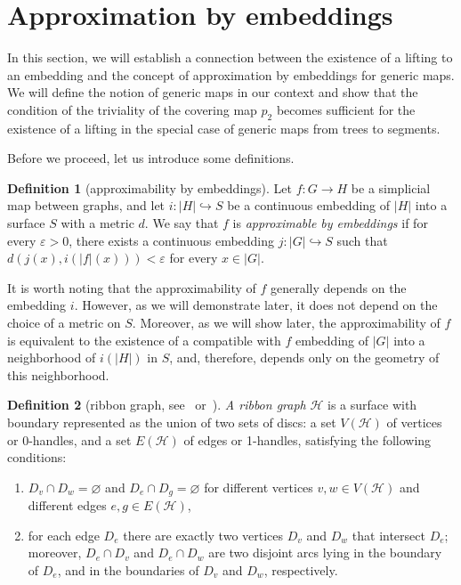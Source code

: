 \documentclass[a4paper,12pt,reqno,oneside]{amsart}
\theoremstyle{plain}
\theoremstyle{definition}
\newtheorem*{definition}{Definition}
\theoremstyle{plain}
\newcommand{\from}{\colon}
\newcommand{\HH}{\mathcal{H}}
\begin{document}
\section{Approximation by embeddings}

In this section, we will establish a connection between the existence of a lifting to an embedding
and the concept of approximation by embeddings for generic maps. We will define the notion of
generic maps in our context and show that the condition of the triviality of the covering map $p_2$
becomes sufficient for the existence of a lifting in the special case of generic maps from trees to
segments.

Before we proceed, let us introduce some definitions.

\begin{definition}[approximability by embeddings]
  Let $f \from G \to H$ be a simplicial map between graphs, and let $i \from |H| \hookrightarrow S$
  be a continuous embedding of $|H|$ into a surface $S$ with a metric $d$. We say that $f$ is
  \emph{approximable by embeddings} if for every
  $\varepsilon > 0$, there exists a continuous embedding $j \from |G| \hookrightarrow S$ such that
  $d(j(x), i(|f|(x))) < \varepsilon$ for every $x \in |G|$.
\end{definition}

It is worth noting that the approximability of $f$ generally depends on the embedding $i$. However,
as we will demonstrate later, it does not depend on the choice of a metric on $S$. Moreover, as we
will show later, the approximability of $f$ is equivalent to the existence of a compatible with $f$
embedding of $|G|$ into a neighborhood of $i(|H|)$ in $S$, and, therefore, depends only on the
geometry of this neighborhood.

\begin{definition}[{ribbon graph, see~\cite[Definition 1.5]{graphs_surfaces} or~\cite[Definition 2.4]{minc}}]
  \emph{A ribbon graph} $\HH$ is a surface with boundary represented as the union of two sets of
  discs: a set $V(\HH)$ of vertices or 0-handles, and a set $E(\HH)$ of edges or 1-handles,
  satisfying the following conditions:
  \begin{enumerate}
  \item $D_v \cap D_w = \varnothing$ and $D_e \cap D_g = \varnothing$ for different vertices
    $v, w \in V(\HH)$ and different edges $e, g \in E(\HH)$,
  \item for each edge $D_e$ there are exactly two vertices $D_v$ and $D_w$ that intersect $D_e$;
    moreover, $D_e \cap D_v$ and $D_e \cap D_w$ are two disjoint arcs lying in the boundary of
    $D_e$, and in the boundaries of $D_v$ and $D_w$, respectively.
  \end{enumerate}
\end{definition}
\end{document}
